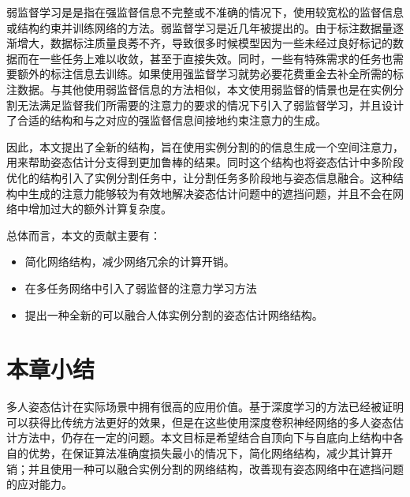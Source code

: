 弱监督学习是是指在强监督信息不完整或不准确的情况下，使用较宽松的监督信息或结构约束并训练网络的方法\cite{10.1093/nsr/nwx106}。弱监督学习是近几年被提出的。由于标注数据量逐渐增大，数据标注质量良莠不齐，导致很多时候模型因为一些未经过良好标记的数据而在一些任务上难以收敛，甚至于直接失效。同时，一些有特殊需求的任务也需要额外的标注信息去训练。如果使用强监督学习就势必要花费重金去补全所需的标注数据。与其他使用弱监督信息的方法相似，本文使用弱监督的情景也是在实例分割无法满足监督我们所需要的注意力的要求的情况下引入了弱监督学习，并且设计了合适的结构和与之对应的强监督信息间接地约束注意力的生成。

因此，本文提出了全新的结构，旨在使用实例分割的的信息生成一个空间注意力，用来帮助姿态估计分支得到更加鲁棒的结果。同时这个结构也将姿态估计中多阶段优化的结构引入了实例分割任务中，让分割任务多阶段地与姿态信息融合。这种结构中生成的注意力能够较为有效地解决姿态估计问题中的遮挡问题，并且不会在网络中增加过大的额外计算复杂度。

总体而言，本文的贡献主要有：
\begin{itemize}
	\item 简化网络结构，减少网络冗余的计算开销。
	\item 在多任务网络中引入了弱监督的注意力学习方法
	\item 提出一种全新的可以融合人体实例分割的姿态估计网络结构。
\end{itemize}

\section{本章小结}
\label{sec:introconclusion}
多人姿态估计在实际场景中拥有很高的应用价值。基于深度学习的方法已经被证明可以获得比传统方法更好的效果，但是在这些使用深度卷积神经网络的多人姿态估计方法中，仍存在一定的问题。本文目标是希望结合自顶向下与自底向上结构中各自的优势，在保证算法准确度损失最小的情况下，简化网络结构，减少其计算开销；并且使用一种可以融合实例分割的网络结构，改善现有姿态网络中在遮挡问题的应对能力。